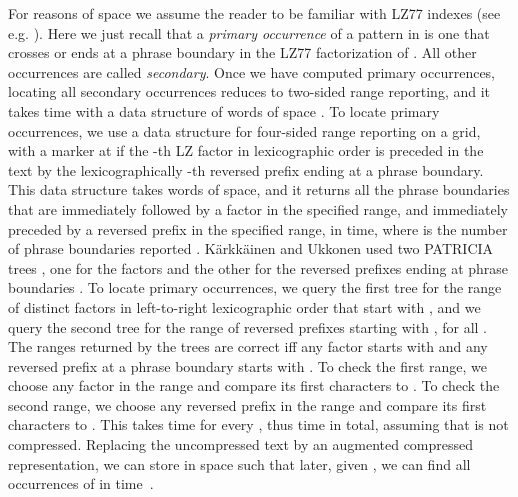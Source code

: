 \documentclass[a4paper,UKenglish]{lipics-v2016}
\begin{document}
For reasons of space we assume the reader to be familiar with LZ77 indexes (see e.g. \cite{gagie2014lz77,karkkainen1996lempel}). Here we just recall that a \emph{primary occurrence} of a pattern  in  is one that crosses or ends at a phrase boundary in the LZ77 factorization  of . All other occurrences are called \emph{secondary}. Once we have computed primary occurrences, locating all  secondary occurrences reduces to two-sided range reporting, and it takes  time with a data structure of  words of space \cite{karkkainen1996lempel}. To locate primary occurrences, we use a data structure for four-sided range reporting on a  grid, with a marker at  if the -th LZ factor in lexicographic order is preceded in the text by the lexicographically -th reversed prefix ending at a phrase boundary. This data structure takes  words of space, and it returns all the phrase boundaries that are immediately followed by a factor in the specified range, and immediately preceded by a reversed prefix in the specified range, in  time, where  is the number of phrase boundaries reported \cite{chan2011orthogonal}. K\"arkk\"ainen and Ukkonen used two PATRICIA trees \cite{morrison1968patricia}, one for the factors and the other for the reversed prefixes ending at phrase boundaries \cite{karkkainen1996lempel}. To locate primary occurrences, we query the first tree for the range of distinct factors in left-to-right lexicographic order that start with , and we query the second tree for the range of reversed prefixes  starting with , for all . The ranges returned by the trees are correct iff any factor starts with  and any reversed prefix at a phrase boundary starts with . To check the first range, we choose any factor in the range and compare its first  characters to . To check the second range, we choose any reversed prefix in the range and compare its first  characters to . This takes  time for every , thus  time in total, assuming that  is not compressed. Replacing the uncompressed text by an augmented compressed representation, we can store  in  space such that later, given , we can find all  occurrences of  in  time~\cite{gagie2014lz77}.
\end{document}
